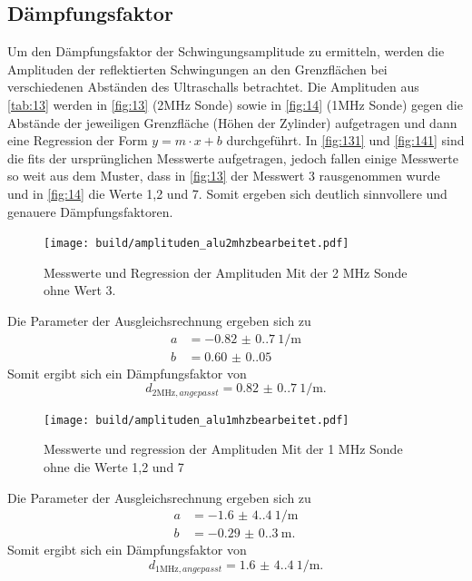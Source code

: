 \subsection{Dämpfungsfaktor}
Um den Dämpfungsfaktor der Schwingungsamplitude zu ermitteln, werden die
Amplituden der reflektierten Schwingungen an den Grenzflächen bei verschiedenen
Abständen des Ultraschalls betrachtet. Die Amplituden aus \autoref{tab:13} werden
in \autoref{fig:13} (2$\unit{\mega\hertz}$ Sonde) sowie in \autoref{fig:14} 
(1$\unit{\mega\hertz}$ Sonde) gegen die Abstände der jeweiligen Grenzfläche 
(Höhen der Zylinder) aufgetragen und dann eine Regression der Form 
$y = m \cdot x + b$  durchgeführt. In \autoref{fig:131} und \autoref{fig:141} sind
die fits der ursprünglichen Messwerte aufgetragen, jedoch fallen einige
Messwerte so weit aus dem Muster, dass in \autoref{fig:13} der Messwert 3 rausgenommen wurde und in \autoref{fig:14} die Werte 1,2 und 7.
Somit ergeben sich deutlich sinnvollere und genauere Dämpfungsfaktoren.
 
\begin{figure}[H]
    \centering
    \caption{Messwerte und Regression der Amplituden Mit der 2 $\unit{\mega\hertz}$ Sonde ohne Wert 3.}
    \label{fig:13}
    \texttt{[image: build/amplituden\_alu2mhzbearbeitet.pdf]}
\end{figure}
Die Parameter der Ausgleichsrechnung ergeben sich zu 
\begin{align*}
    a &= \qty{-0.82(0.7)}{1 \per\meter}\\
    b &= \qty{0.60(0.05)}{}
\end{align*}
Somit ergibt sich ein Dämpfungsfaktor von 
\begin{equation}
    d_{2\unit{\mega\hertz},angepasst} = \qty{0.82(0.7)}{1 \per\meter}.
\end{equation}

\begin{figure}[H]
    \centering
    \caption{Messwerte und regression der Amplituden Mit der 1 $\unit{\mega\hertz}$ Sonde ohne die Werte 1,2 und 7}
    \label{fig:14}
    \texttt{[image: build/amplituden\_alu1mhzbearbeitet.pdf]}
\end{figure}
\noindent Die Parameter der Ausgleichsrechnung ergeben sich zu 
\begin{align*}
    a &= \qty{-1.6(4.4)}{1 \per\meter}\\
    b &= \qty{-0.29(0.30)}{\meter}.
\end{align*}
Somit ergibt sich ein Dämpfungsfaktor von 
\begin{equation}
    d_{1 \unit{\mega\hertz},angepasst} = \qty{1.6(4.4)}{1 \per\meter}.
\end{equation}

